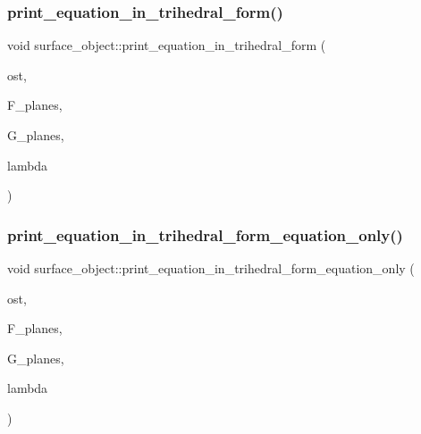 \mbox{\label{classsurface__object_ac0255c793ce4ffc32e1cecb06756dc6f}} 
\subsubsection{\texorpdfstring{print\+\_\+equation\+\_\+in\+\_\+trihedral\+\_\+form()}{print\_equation\_in\_trihedral\_form()}}
{\footnotesize\ttfamily void surface\+\_\+object\+::print\+\_\+equation\+\_\+in\+\_\+trihedral\+\_\+form (\begin{DoxyParamCaption}\item[{ostream \&}]{ost,  }\item[{\mbox{\hyperlink{galois_8h_a09fddde158a3a20bd2dcadb609de11dc}{I\+NT}} $\ast$}]{F\+\_\+planes,  }\item[{\mbox{\hyperlink{galois_8h_a09fddde158a3a20bd2dcadb609de11dc}{I\+NT}} $\ast$}]{G\+\_\+planes,  }\item[{\mbox{\hyperlink{galois_8h_a09fddde158a3a20bd2dcadb609de11dc}{I\+NT}}}]{lambda }\end{DoxyParamCaption})}

\mbox{\label{classsurface__object_ae570775863861dbf2127f755b9c886bd}} 
\subsubsection{\texorpdfstring{print\+\_\+equation\+\_\+in\+\_\+trihedral\+\_\+form\+\_\+equation\+\_\+only()}{print\_equation\_in\_trihedral\_form\_equation\_only()}}
{\footnotesize\ttfamily void surface\+\_\+object\+::print\+\_\+equation\+\_\+in\+\_\+trihedral\+\_\+form\+\_\+equation\+\_\+only (\begin{DoxyParamCaption}\item[{ostream \&}]{ost,  }\item[{\mbox{\hyperlink{galois_8h_a09fddde158a3a20bd2dcadb609de11dc}{I\+NT}} $\ast$}]{F\+\_\+planes,  }\item[{\mbox{\hyperlink{galois_8h_a09fddde158a3a20bd2dcadb609de11dc}{I\+NT}} $\ast$}]{G\+\_\+planes,  }\item[{\mbox{\hyperlink{galois_8h_a09fddde158a3a20bd2dcadb609de11dc}{I\+NT}}}]{lambda }\end{DoxyParamCaption})}

